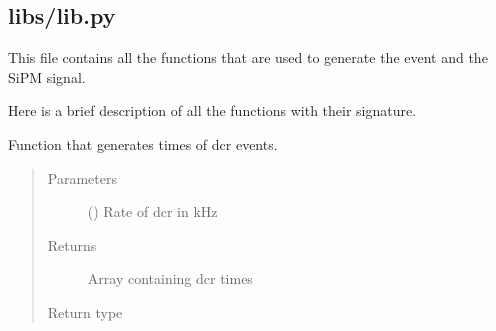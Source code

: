 \documentclass[letterpaper,10pt,english]{sphinxmanual}
\begin{document}
\subsection{libs/lib.py}
\label{\detokenize{structure:libs-lib-py}}
\begin{DUlineblock}{0em}
\item[] This file contains all the functions that are used to generate the event and the SiPM signal.
\item[] Here is a brief description of all the functions with their signature.
\end{DUlineblock}

\begin{fulllineitems}
\label{\detokenize{structure:libs.lib.addDCR}}
Function that generates times of dcr events.
\begin{quote}\begin{description}
\item[{Parameters}] \leavevmode
{} () \textendash{} Rate of dcr in kHz

\item[{Returns}] \leavevmode
{} \textendash{} Array containing dcr times

\item[{Return type}] \leavevmode
{}

\end{description}\end{quote}

\end{fulllineitems}

\end{document}
